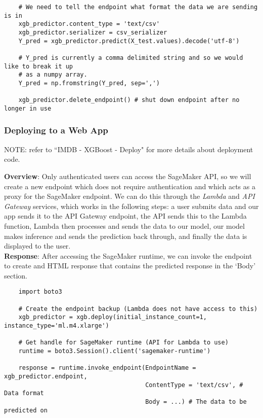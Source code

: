 \documentclass[11pt, a4paper]{article}
\begin{document}
\begin{spacing}{1.1}
\begin{lstlisting}
	# We need to tell the endpoint what format the data we are sending is in
	xgb_predictor.content_type = 'text/csv'
	xgb_predictor.serializer = csv_serializer
	Y_pred = xgb_predictor.predict(X_test.values).decode('utf-8')
	
	# Y_pred is currently a comma delimited string and so we would like to break it up
	# as a numpy array.
	Y_pred = np.fromstring(Y_pred, sep=',')
	
	xgb_predictor.delete_endpoint() # shut down endpoint after no longer in use
	\end{lstlisting} \vspace*{1mm}
	
	\subsubsection{Deploying to a Web App}
	\begin{center}
	\color{darkgray} NOTE: refer to ``IMDB - XGBoost - Deploy" for more details about deployment code. \color{black}
	\end{center}
	\textbf{Overview}: Only authenticated users can access the SageMaker API, so we will create a new endpoint which does not require authentication and which acts as a proxy for the SageMaker endpoint. We can do this through the \textit{Lambda} and \textit{API Gateway} services, which works in the following steps: a user submits data and our app sends it to the API Gateway endpoint, the API sends this to the Lambda function, Lambda then processes and sends the data to our model, our model makes inference and sends the prediction back through, and finally the data is displayed to the user. \vspace*{2mm}\\
	\textbf{Response}: After accessing the SageMaker runtime, we can invoke the endpoint to create and HTML response that contains the predicted response in the `Body' section. 
	\begin{lstlisting}
	import boto3
	
	# Create the endpoint backup (Lambda does not have access to this)
	xgb_predictor = xgb.deploy(initial_instance_count=1, instance_type='ml.m4.xlarge')
	
	# Get handle for SageMaker runtime (API for Lambda to use)
	runtime = boto3.Session().client('sagemaker-runtime')
	
	response = runtime.invoke_endpoint(EndpointName = xgb_predictor.endpoint,
	                                   ContentType = 'text/csv', # Data format
	                                   Body = ...) # The data to be predicted on
	

\end{lstlisting}
\end{spacing}
\end{document}
